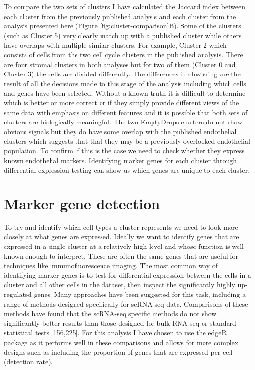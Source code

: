 \documentclass[11pt,a4paper,titlepage,twoside,openright]{style/unimelbthesis}
\theoremstyle{definition}
\theoremstyle{definition}
\theoremstyle{definition}
\theoremstyle{remark}
\begin{document}
\begin{mainmatter}
To compare the two sets of clusters I have calculated the Jaccard index between each cluster from the previously published analysis and each cluster from the analysis presented here (Figure \ref{fig:cluster-comparison}B). Some of the clusters (such as Cluster 5) very clearly match up with a published cluster while others have overlaps with multiple similar clusters. For example, Cluster 2 which consists of cells from the two cell cycle clusters in the published analysis. There are four stromal clusters in both analyses but for two of them (Cluster 0 and Cluster 3) the cells are divided differently. The differences in clustering are the result of all the decisions made to this stage of the analysis including which cells and genes have been selected. Without a known truth it is difficult to determine which is better or more correct or if they simply provide different views of the same data with emphasis on different features and it is possible that both sets of clusters are biologically meaningful. The two EmptyDrops clusters do not show obvious signals but they do have some overlap with the published endothelial clusters which suggests that that they may be a previously overlooked endothelial population. To confirm if this is the case we need to check whether they express known endothelial markers. Identifying marker genes for each cluster through differential expression testing can show us which genes are unique to each cluster.

\hypertarget{marker-genes}{%
\section{Marker gene detection}\label{marker-genes}}

To try and identify which cell types a cluster represents we need to look more closely at what genes are expressed. Ideally we want to identify genes that are expressed in a single cluster at a relatively high level and whose function is well-known enough to interpret. These are often the same genes that are useful for techniques like immunofluorescence imaging. The most common way of identifying marker genes is to test for differential expression between the cells in a cluster and all other cells in the dataset, then inspect the significantly highly up-regulated genes. Many approaches have been suggested for this task, including a range of methods designed specifically for scRNA-seq data. Comparisons of these methods have found that the scRNA-seq specific methods do not show significantly better results than those designed for bulk RNA-seq or standard statistical tests {[}156,225{]}. For this analysis I have chosen to use the edgeR package as it performs well in these comparisons and allows for more complex designs such as including the proportion of genes that are expressed per cell (detection rate).


\end{mainmatter}
\end{document}
